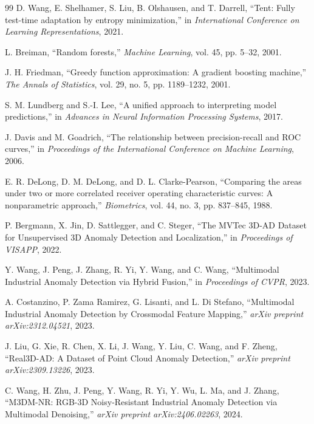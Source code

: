 \documentclass[10pt,conference]{IEEEtran}
\begin{document}
\begin{thebibliography}{99}
D. Wang, E. Shelhamer, S. Liu, B. Olshausen, and T. Darrell, ``Tent: Fully
test-time adaptation by entropy minimization,'' in \emph{International
Conference on Learning Representations}, 2021.

L. Breiman, ``Random forests,'' \emph{Machine Learning}, vol. 45, pp. 5--32,
2001.

J. H. Friedman, ``Greedy function approximation: A gradient boosting machine,''
\emph{The Annals of Statistics}, vol. 29, no. 5, pp. 1189--1232, 2001.

S. M. Lundberg and S.-I. Lee, ``A unified approach to interpreting model
predictions,'' in \emph{Advances in Neural Information Processing Systems}, 2017.

J. Davis and M. Goadrich, ``The relationship between precision-recall and ROC
curves,'' in \emph{Proceedings of the International Conference on Machine
Learning}, 2006.

E. R. DeLong, D. M. DeLong, and D. L. Clarke-Pearson, ``Comparing the areas
under two or more correlated receiver operating characteristic curves: A
nonparametric approach,'' \emph{Biometrics}, vol. 44, no. 3, pp. 837--845,
1988.

P. Bergmann, X. Jin, D. Sattlegger, and C. Steger, ``The MVTec 3D-AD Dataset
for Unsupervised 3D Anomaly Detection and Localization,'' in
\emph{Proceedings of VISAPP}, 2022.

Y. Wang, J. Peng, J. Zhang, R. Yi, Y. Wang, and C. Wang, ``Multimodal
Industrial Anomaly Detection via Hybrid Fusion,'' in \emph{Proceedings of
CVPR}, 2023.

A. Costanzino, P. Zama Ramirez, G. Lisanti, and L. Di Stefano, ``Multimodal
Industrial Anomaly Detection by Crossmodal Feature Mapping,'' \emph{arXiv
preprint arXiv:2312.04521}, 2023.

J. Liu, G. Xie, R. Chen, X. Li, J. Wang, Y. Liu, C. Wang, and F. Zheng,
``Real3D-AD: A Dataset of Point Cloud Anomaly Detection,'' \emph{arXiv
preprint arXiv:2309.13226}, 2023.

C. Wang, H. Zhu, J. Peng, Y. Wang, R. Yi, Y. Wu, L. Ma, and J. Zhang,
``M3DM-NR: RGB-3D Noisy-Resistant Industrial Anomaly Detection via Multimodal
Denoising,'' \emph{arXiv preprint arXiv:2406.02263}, 2024.


\end{thebibliography}
\end{document}
